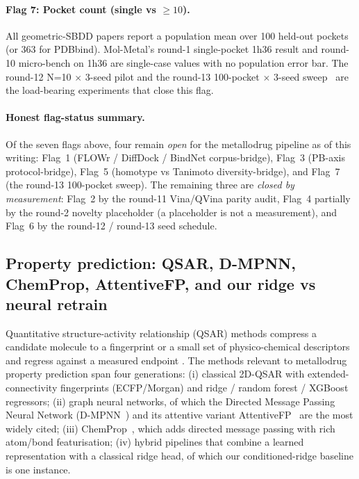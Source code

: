 \paragraph{Flag 7: Pocket count (single vs $\geq 10$).}
All geometric-SBDD papers report a population mean over 100 held-out
pockets (or 363 for PDBbind). Mol-Metal's round-1 single-pocket
1h36 result and round-10 micro-bench on 1h36 are single-case values
with no population error bar. The round-12 N=10 $\times$ 3-seed pilot
\cite{footnote:round12_pilot} and the round-13 100-pocket
$\times$ 3-seed sweep~\cite{footnote:round13_sweep} are the load-bearing
experiments that close this flag.

\paragraph{Honest flag-status summary.}
Of the seven flags above, four remain \emph{open} for the metallodrug
pipeline as of this writing: Flag~1 (FLOWr / DiffDock / BindNet
corpus-bridge), Flag~3 (PB-axis protocol-bridge), Flag~5 (homotype vs
Tanimoto diversity-bridge), and Flag~7 (the round-13 100-pocket
sweep). The remaining three are \emph{closed by measurement}: Flag~2
by the round-11 Vina/QVina parity audit, Flag~4 partially by the
round-2 novelty placeholder (a placeholder is not a measurement), and
Flag~6 by the round-12 / round-13 seed schedule.

\subsection{Property prediction: QSAR, D-MPNN, ChemProp, AttentiveFP, and our ridge vs neural retrain}
\label{sec:related:qsar}

Quantitative structure-activity relationship (QSAR) methods compress a
candidate molecule to a fingerprint or a small set of physico-chemical
descriptors and regress against a measured endpoint
\cite{footnote:qsar_review}. The methods relevant to metallodrug
property prediction span four generations: (i) classical 2D-QSAR with
extended-connectivity fingerprints (ECFP/Morgan) and ridge / random
forest / XGBoost regressors; (ii) graph neural networks, of which the
Directed Message Passing Neural Network (D-MPNN~\cite{footnote:dmpnn})
and its attentive variant AttentiveFP~\cite{footnote:attentivefp} are
the most widely cited; (iii) ChemProp~\cite{footnote:chemprop}, which
adds directed message passing with rich atom/bond featurisation;
(iv) hybrid pipelines that combine a learned representation with a
classical ridge head, of which our conditioned-ridge baseline is one
instance.

